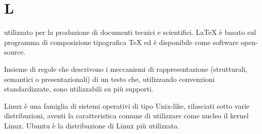 \section{L}

 utilizzato per la produzione di documenti tecnici e scientifici.
\LaTeX{} è basato sul programma di composizione tipografica \TeX{} ed è disponibile come software open-source.

Insieme di regole che descrivono i meccanismi di rappresentazione (strutturali, semantici o presentazionali) di un testo che, utilizzando convenzioni standardizzate, sono utilizzabili su più supporti.

Linux è una famiglia di sistemi operativi di tipo Unix-like, rilasciati sotto varie distribuzioni, aventi la caratteristica comune di utilizzare come nucleo il kernel Linux. Ubuntu è la distribuzione di Linux più utilizzata.


